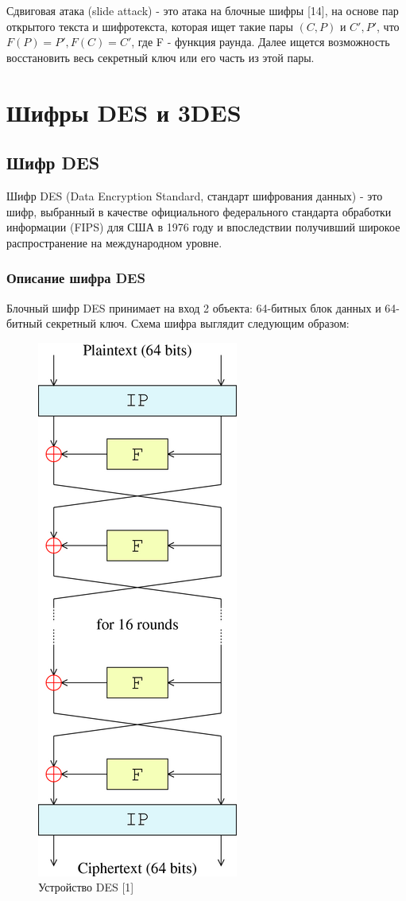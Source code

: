 \documentclass[colorthm]{./civarticle}
\begin{document}
\begin{definition}
    Сдвиговая атака (slide attack) - это атака на блочные шифры [14], на основе пар открытого текста и шифротекста, которая ищет такие пары $(C, P)$ и $C', P'$, что $F(P) = P', F(C) = C'$, где F - функция раунда. Далее ищется возможность восстановить весь секретный ключ или его часть из этой пары.
\end{definition}

\section{Шифры DES и 3DES}

\subsection{Шифр DES}
Шифр DES (Data Encryption Standard, стандарт шифрования данных) - это шифр, выбранный в качестве официального федерального стандарта обработки информации (FIPS) для США в 1976 году и впоследствии получивший широкое распространение на международном уровне.

\subsubsection{Описание шифра DES}

Блочный шифр DES принимает на вход 2 объекта: 64-битных блок данных и 64-битный секретный ключ. Схема шифра выглядит следующим образом: 

\begin{figure}[H]
    \centering
    \includegraphics[width=0.25\linewidth]{DES-main-network.png}
    \caption{Устройство DES [1]}
    \label{fig:enter-label}
\end{figure}
\end{document}
